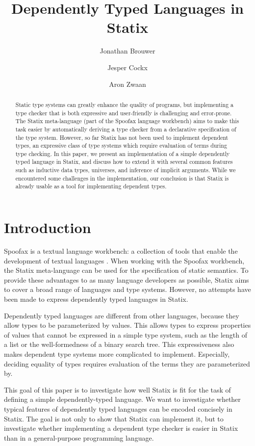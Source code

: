 \documentclass[a4paper,UKenglish,cleveref, autoref, thm-restate]{oasics-v2021}
\title{Dependently Typed Languages in Statix}
\author{Jonathan Brouwer}{Delft University of Technology, The Netherlands \and \url{http://jonathanb.nl}}{j.t.brouwer@student.tudelft.nl}{}{}
\author{Jesper Cockx}{Delft University of Technology, The Netherlands \and \url{http://jesper.sikanda.be}}{j.g.h.cockx@tudelft.nl}{}{}
\author{Aron Zwaan}{Delft University of Technology, The Netherlands \and \url{http://aronzwaan.github.io}}{a.s.zwaan@tudelft.nl}{}{}
\begin{document}
\maketitle

\begin{abstract}
Static type systems can greatly enhance the quality of programs, but implementing a type checker that is both expressive and user-friendly is challenging and error-prone. The Statix meta-language (part of the Spoofax language workbench) aims to make this task easier by automatically deriving a type checker from a declarative specification of the type system. However, so far Statix has not been used to implement dependent types, an expressive class of type systems which require evaluation of terms during type checking. In this paper, we present an implementation of a simple dependently typed language in Statix, and discuss how to extend it with several common features such as inductive data types, universes, and inference of implicit arguments. While we encountered some challenges in the implementation, our conclusion is that Statix is already usable as a tool for implementing dependent types.
\end{abstract}

\section{Introduction}

Spoofax is a textual language workbench: \label{key}a collection of tools that enable the development of textual languages \cite{spoofax}. When working with the Spoofax workbench, the Statix meta-language can be used for the specification of static semantics. To provide these advantages to as many language developers as possible, Statix aims to cover a broad range of languages and type systems. However, no attempts have been made to express dependently typed languages in Statix. 

Dependently typed languages are different from other languages, because they allow types to be parameterized by values. This allows types to express properties of values that cannot be expressed in a simple type system, such as the length of a list or the well-formedness of a binary search tree. This expressiveness also makes dependent type systems more complicated to implement. Especially, deciding equality of types requires evaluation of the terms they are parameterized by. 

This goal of this paper is to investigate how well Statix is fit for the task of defining a simple dependently-typed language. We want to investigate whether typical features of dependently typed languages can be encoded concisely in Statix. The goal is not only to show that Statix can implement it, but to investigate whether implementing a dependent type checker is easier in Statix than in a general-purpose programming language.
\end{document}
